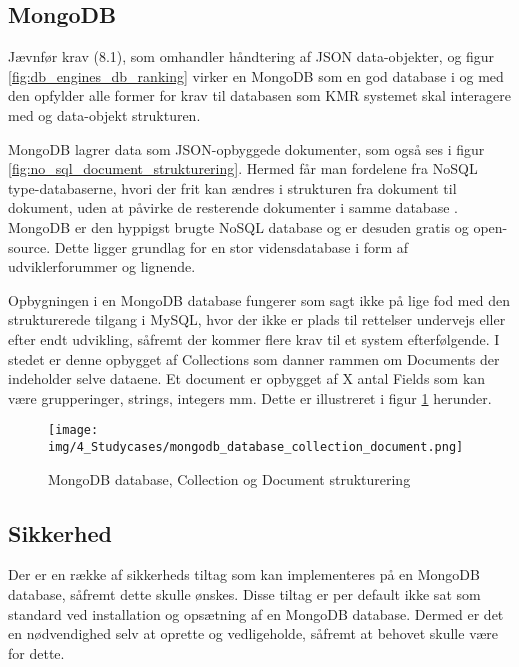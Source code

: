 \begin{appendices}
\subsection{MongoDB}
Jævnfør krav (8.1), som omhandler håndtering af JSON data-objekter, og figur \ref{fig:db_engines_db_ranking} virker en MongoDB som en god database i og med den opfylder alle former for krav til databasen som KMR systemet skal interagere med og data-objekt strukturen. 

MongoDB lagrer data som JSON-opbyggede dokumenter, som også ses i figur \ref{fig:no_sql_document_strukturering}. Hermed får man fordelene fra NoSQL type-databaserne, hvori der frit kan ændres i strukturen fra dokument til dokument, uden at påvirke de resterende dokumenter i samme database \cite{mongodb_LDAP}. MongoDB er den hyppigst brugte NoSQL database og er desuden gratis og open-source. Dette ligger grundlag for en stor vidensdatabase i form af udviklerforummer og lignende. 

Opbygningen i en MongoDB database fungerer som sagt ikke på lige fod med den strukturerede tilgang i MySQL, hvor der ikke er plads til rettelser undervejs eller efter endt udvikling, såfremt der kommer flere krav til et system efterfølgende. I stedet er denne opbygget af Collections som danner rammen om Documents der indeholder selve dataene. Et document er opbygget af X antal Fields som kan være grupperinger, strings, integers mm. Dette er illustreret i figur \ref{fig:mongodb_database_collection_document_} herunder.

\begin{figure}[H]
	\centering{}
	\texttt{[image: img/4\_Studycases/mongodb\_database\_collection\_document.png]}
	\caption{MongoDB database, Collection og Document strukturering}
	\label{fig:mongodb_database_collection_document_}
\end{figure}

\pagebreak

\subsection{Sikkerhed}

Der er en række af sikkerheds tiltag som kan implementeres på en MongoDB database, såfremt dette skulle ønskes. Disse tiltag er per default ikke sat som standard ved installation og opsætning af en MongoDB database. Dermed er det en nødvendighed selv at oprette og vedligeholde, såfremt at behovet skulle være for dette. \\


\end{appendices}
